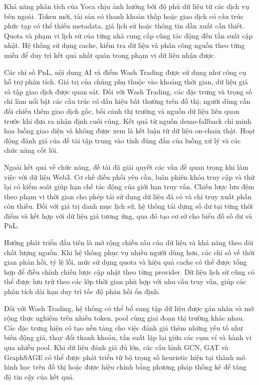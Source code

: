 Khả năng phân tích của Yoca chịu ảnh hưởng bởi độ phủ dữ liệu từ các dịch vụ bên ngoài. Token mới, tài sản có thanh khoản thấp hoặc giao dịch có cấu trúc phức tạp có thể thiếu metadata, giá lịch sử hoặc thông tin dẫn xuất cần thiết. Quota và phạm vi lịch sử của từng nhà cung cấp cũng tác động đến tần suất cập nhật. Hệ thống sử dụng cache, kiểm tra dữ liệu và phân công nguồn theo từng miền để duy trì kết quả nhất quán trong phạm vi dữ liệu nhận được.

Các chỉ số PnL, nội dung AI và điểm Wash Trading được sử dụng như công cụ hỗ trợ phân tích. Giá trị của chúng phụ thuộc vào khoảng thời gian, dữ liệu giá và tập giao dịch được quan sát. Đối với Wash Trading, các đặc trưng và trọng số chỉ làm nổi bật các cấu trúc có dấu hiệu bất thường trên đồ thị; người dùng cần đối chiếu thêm giao dịch gốc, bối cảnh thị trường và nguồn dữ liệu liên quan trước khi đưa ra nhận định cuối cùng. Kết quả từ nguồn demo-fallback chỉ minh họa luồng giao diện và không được xem là kết luận từ dữ liệu on-chain thật. Hoạt động đánh giá của đề tài tập trung vào tính đúng đắn của luồng xử lý và các chức năng cốt lõi.

Ngoài kết quả về chức năng, đề tài đã giải quyết các vấn đề quan trọng khi làm việc với dữ liệu Web3. Cơ chế điều phối yêu cầu, luân phiên khóa truy cập và thử lại có kiểm soát giúp hạn chế tác động của giới hạn truy vấn. Chiến lược lưu đệm theo phạm vi thời gian cho phép tái sử dụng dữ liệu đã có và chỉ truy xuất phần còn thiếu. Đối với giá trị danh mục lịch sử, hệ thống tái dựng số dư tại từng thời điểm và kết hợp với dữ liệu giá tương ứng, qua đó tạo cơ sở cho biểu đồ số dư và PnL.

Hướng phát triển đầu tiên là mở rộng chiều sâu của dữ liệu và khả năng theo dõi chất lượng nguồn. Khi hệ thống phục vụ nhiều người dùng hơn, các chỉ số về thời gian phản hồi, tỷ lệ lỗi, mức sử dụng quota và hiệu quả cache có thể được tổng hợp để điều chỉnh chiến lược cập nhật theo từng provider. Dữ liệu lịch sử cũng có thể được lưu trữ theo các lớp thời gian phù hợp với nhu cầu truy vấn, giúp các phân tích dài hạn duy trì tốc độ phản hồi ổn định.

Đối với Wash Trading, hệ thống có thể bổ sung tập dữ liệu được gán nhãn và mở rộng thực nghiệm trên nhiều token, pool cùng giai đoạn thị trường khác nhau. Các đặc trưng hiện có tạo nền tảng cho việc đánh giá thêm những yếu tố như biến động giá, thay đổi thanh khoản, tần suất lặp lại giữa các cụm ví và hành vi qua nhiều pool. Khi dữ liệu đánh giá đủ lớn, các cấu hình GCN, GAT và GraphSAGE có thể được phát triển từ bộ trọng số heuristic hiện tại thành mô hình học trên đồ thị hoặc được hiệu chỉnh bằng phương pháp thống kê để tăng độ tin cậy của kết quả.

